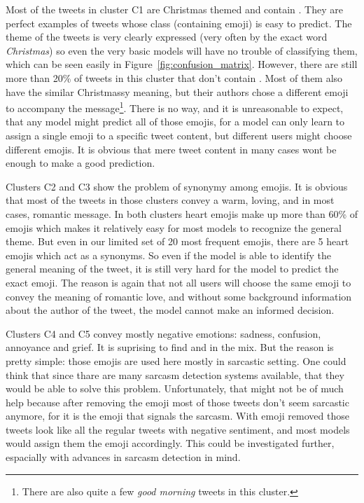 \documentclass[10pt, a4paper]{article}
\begin{document}
Most of the tweets in cluster C1 are Christmas themed and contain .
They are perfect examples of tweets whose class (containing emoji) is easy to 
predict. The theme of the tweets is very clearly expressed (very often by the 
exact word \emph{Christmas}) so even the very basic models will have no trouble 
of classifying them, which can be seen easily in 
Figure~\ref{fig:confusion_matrix}. However, there are still more than 20\% of 
tweets in this cluster that don't contain . Most of them also have 
the similar Christmassy meaning, but their authors chose a different emoji to 
accompany the message\footnote{There are also quite a few \emph{good morning} 
tweets in this cluster.}. There is no way, and it is unreasonable to expect, 
that any model might predict all of those emojis, for a model can only learn to 
assign a single emoji to a specific tweet content, but different users might 
choose different emojis. It is obvious that mere tweet content in many cases 
wont be enough to make a good prediction.

Clusters C2 and C3 show the problem of synonymy among emojis. It is obvious that
most of the tweets in those clusters convey a warm, loving, and in most cases, 
romantic message. In both clusters heart emojis make up more than 60\% of emojis
which makes it relatively easy for most models to recognize the general theme. 
But even in our limited set of 20 most frequent emojis, there are 5 heart emojis
which act as a synonyms. So even if the model is able to identify the general 
meaning of the tweet, it is still very hard for the model to predict the exact 
emoji. The reason is again that not all users will choose the same emoji to 
convey the meaning of romantic love, and without some background information 
about the author of the tweet, the model cannot make an informed decision.

Clusters C4 and C5 convey mostly negative emotions: sadness, confusion, 
annoyance and grief. It is suprising to find  and  in 
the mix. But the reason is pretty simple: those emojis are used here mostly in 
sarcastic setting. One could think that since thare are many sarcasm detection 
systems available, that they would be able to solve this problem. Unfortunately,
that might not be of much help because after removing the emoji most of those 
tweets don't seem sarcastic anymore, for it is the emoji that signals the 
sarcasm. With emoji removed those tweets look like all the regular tweets with 
negative sentiment, and most models would assign them the emoji accordingly. 
This could be investigated further, espacially with advances in sarcasm 
detection in mind.
\end{document}
